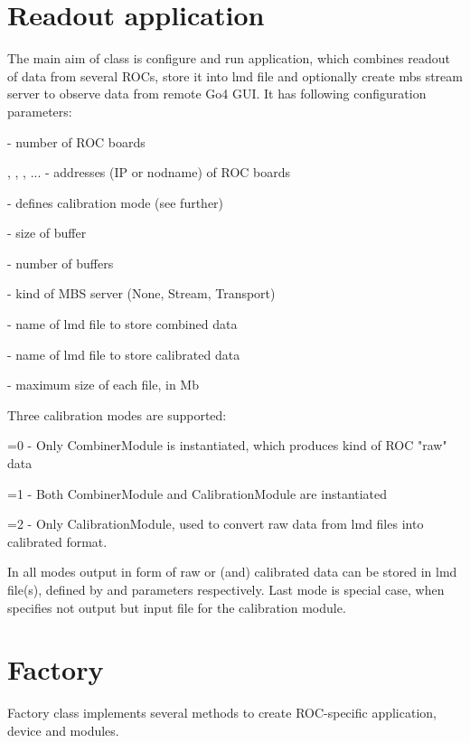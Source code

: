 \section{Readout application}

The main aim of  class is configure and run application,
which combines readout of data from several ROCs, store it into lmd file and optionally 
create mbs stream server to observe data from remote Go4 GUI.
It has following configuration parameters:

\bbul
\item {}   - number of ROC boards  
\item {}, , , ... - addresses (IP or nodname) of ROC boards
\item {}  - defines calibration mode (see further)
\item {} - size of buffer
\item {} - number of buffers
\item {} - kind of MBS server (None, Stream, Transport)
\item {} - name of lmd file to store combined data
\item {} - name of lmd file to store calibrated data
\item {} - maximum size of each file, in Mb
\ebul

Three calibration modes are supported:
\bbul
\item {}=0 - Only CombinerModule is instantiated, which produces kind of ROC "raw" data 
\item {}=1 - Both CombinerModule and CalibrationModule are instantiated   
\item {}=2 - Only CalibrationModule, used to convert raw data from lmd files into calibrated format.
\ebul

In all modes output in form of raw or (and) calibrated data can be stored in lmd file(s),
defined by  and  parameters respectively. Last mode is special case,
when  specifies not output but input file for the calibration module.


\section{Factory}

Factory class  implements several methods to create
ROC-specific application, device and modules.    


